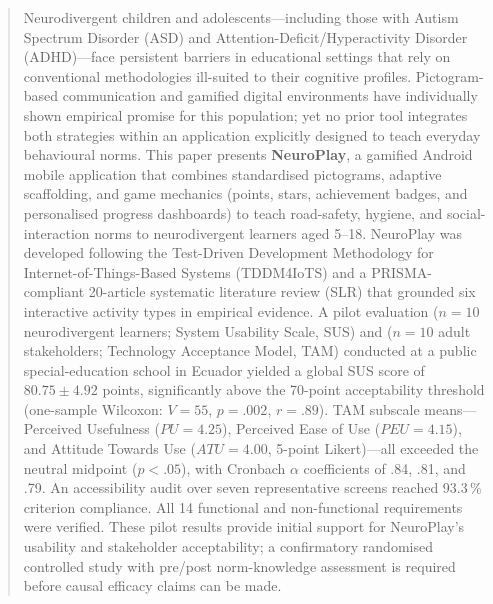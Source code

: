 \documentclass[preprint,12pt]{elsarticle}
\begin{document}
\begin{frontmatter}
        \begin{abstract}
            Neurodivergent children and adolescents---including those with Autism Spectrum Disorder (ASD) and Attention-Deficit/Hyperactivity Disorder (ADHD)---face persistent barriers in educational settings that rely on conventional methodologies ill-suited to their cognitive profiles. Pictogram-based communication and gamified digital environments have individually shown empirical promise for this population; yet no prior tool integrates both strategies within an application explicitly designed to teach everyday behavioural norms. This paper presents \textbf{NeuroPlay}, a gamified Android mobile application that combines standardised pictograms, adaptive scaffolding, and game mechanics (points, stars, achievement badges, and personalised progress dashboards) to teach road-safety, hygiene, and social-interaction norms to neurodivergent learners aged 5--18. NeuroPlay was developed following the Test-Driven Development Methodology for Internet-of-Things-Based Systems (TDDM4IoTS) and a PRISMA-compliant 20-article systematic literature review (SLR) that grounded six interactive activity types in empirical evidence. A pilot evaluation ($n = 10$ neurodivergent learners; System Usability Scale, SUS) and ($n = 10$ adult stakeholders; Technology Acceptance Model, TAM) conducted at a public special-education school in Ecuador yielded a global SUS score of $80.75 \pm 4.92$ points, significantly above the 70-point acceptability threshold (one-sample Wilcoxon: $V = 55$, $p = .002$, $r = .89$). TAM subscale means---Perceived Usefulness ($\mathit{PU} = 4.25$), Perceived Ease of Use ($\mathit{PEU} = 4.15$), and Attitude Towards Use ($\mathit{ATU} = 4.00$, 5-point Likert)---all exceeded the neutral midpoint ($p < .05$), with Cronbach $\alpha$ coefficients of .84, .81, and .79. An accessibility audit over seven representative screens reached 93.3\,\% criterion compliance. All 14 functional and non-functional requirements were verified. These pilot results provide initial support for NeuroPlay's usability and stakeholder acceptability; a confirmatory randomised controlled study with pre/post norm-knowledge assessment is required before causal efficacy claims can be made.

\end{abstract}
\end{frontmatter}
\end{document}
